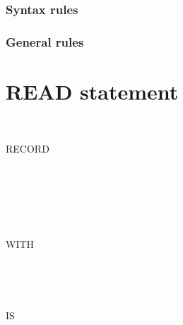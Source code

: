 \subsubsection{Syntax rules}

\subsubsection{General rules}

\section{READ statement}

\begin{syntax}
   \filename
  \begin{0-1}
     \\
  \end{0-1}
  RECORD
  \begin{0-1}
     \identifier
  \end{0-1}

  \begin{0-1}
    \begin{1=}
        \\
    \end{1=} \\

    \begin{0-1}
       \\
    \end{0-1}
    \begin{0-1}
      WITH
      \begin{1=}
        \begin{0-1}
           \\
        \end{0-1}
         \\

      \end{1=}
    \end{0-1}
  \end{0-1}

  \begin{0-1}
     IS \identifier
  \end{0-1}

  \begin{0-1}
    \begin{1+}
        \imperativestatement \\
         \imperativestatement
    \end{1+} \\


\end{0-1}
\end{syntax}
